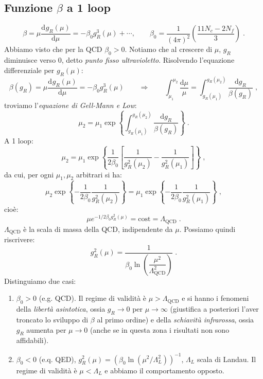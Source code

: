 \documentclass[12pt,a4paper]{article}
\theoremstyle{definition}
\newcommand{\dev}[3][]{\frac{\mathrm{d}^{#1} #2}{\mathrm{d} #3^{#1}}}
\newcommand{\diff}[1][]{\mathrm{d}#1}
\numberwithin{equation}{section}
\begin{document}
\subsection{Funzione $\beta$ a 1 loop}
\begin{equation}
\beta=\mu\dev{g_R(\mu)}{\mu}=-\beta_0g_R^3(\mu)+\cdots,\qquad \beta_0=\frac{1}{(4\pi)^2}\left(\frac{11N_c-2N_f}{3}\right)\;.
\end{equation}
Abbiamo visto che per la QCD $\beta_0>0$. Notiamo che al crescere di $\mu$, $g_R$ diminuisce verso 0, detto \emph{punto fisso ultravioletto}. Risolvendo l'equazione differenziale per $g_R(\mu)$:
\begin{equation}
\beta(g_R)=\mu\dev{g_R(\mu)}{\mu}=-\beta_0g_R^3(\mu)\qquad \Longrightarrow\qquad \int_{\mu_1}^{\mu_2}\frac{\diff{\mu}}{\mu}=\int_{g_R(\mu_1)}^{g_R(\mu_2)}\frac{\diff{g_R}}{\beta(g_R)}\;,
\end{equation}
troviamo l'\emph{equazione di Gell-Mann e Low}:
\begin{equation}
\mu_2=\mu_1\exp\left\{\int_{g_R(\mu_1)}^{g_R(\mu_2)}\frac{\diff{g_R}}{\beta(g_R)}\right\}\;.
\end{equation}
A 1 loop:
$$
\mu_2=\mu_1\exp\left\{\frac{1}{2\beta_0}\left[\frac{1}{g_R^2(\mu_2)}-\frac{1}{g_R^2(\mu_1)}\right]\right\}\;,
$$
da cui, per ogni $\mu_1,\mu_2$ arbitrari si ha:
\begin{equation}
\mu_2\exp\left\{-\frac{1}{2\beta_0}\frac{1}{g_R^2(\mu_2)}\right\}=\mu_1\exp\left\{-\frac{1}{2\beta_0}\frac{1}{g_R^2(\mu_1)}\right\}\;,
\end{equation}
cioè:
\begin{equation}
\boxed{
\mu e^{-1/2\beta_0g_R^2(\mu)}=\mathrm{cost}=\Lambda_{\mathrm{QCD}}
}\;.
\end{equation}
$\Lambda_{\mathrm{QCD}}$ è la scala di massa della QCD, indipendente da $\mu$. Possiamo quindi riscrivere:
\begin{equation}
g_R^2(\mu)=\frac{1}{\beta_0\ln\left(\dfrac{\mu^2}{\Lambda^2_{\mathrm{QCD}}}\right)}\;.
\end{equation}
Distinguiamo due casi:
\begin{enumerate}
\item $\beta_0>0$ (e.g. QCD). Il regime di validità è $\mu>\Lambda_{\mathrm{QCD}}$ e si hanno i fenomeni della \emph{libertà asintotica}, ossia $g_R\to 0$ per $\mu\to\infty$ (giustifica a posteriori l'aver troncato lo sviluppo di $\beta$ al primo ordine) e della \emph{schiavitù infrarossa}, ossia $g_R$ aumenta per $\mu\to 0$ (anche se in questa zona i risultati non sono affidabili).
\item $\beta_0<0$ (e.q. QED), $g_R^2(\mu)=\left(\beta_0\ln(\mu^2/\Lambda^2_L)\right)^{-1}$, $\Lambda_L$ scala di Landau. Il regime di validità è $\mu<\Lambda_L$ e abbiamo il comportamento opposto.
\end{enumerate}
\end{document}
